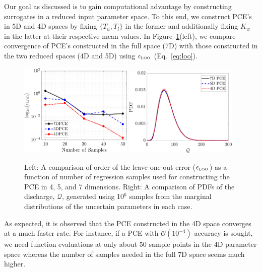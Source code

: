 Our goal as discussed is to gain computational advantage by constructing
surrogates in a reduced input parameter space. To this end, we construct PCE's
in 5D and 4D spaces by fixing $\{T_u,T_l\}$ in the former and additionally
fixing $K_w$ in the latter at their respective mean values. In
Figure~\ref{fig:conv_bore}(left), we compare convergence of PCE's constructed in the
full space (7D) with those constructed in the two reduced spaces (4D and 5D)
using $\epsilon_{\mbox{\tiny{LOO}}}$ (Eq.~\ref{eq:loo}). 
\begin{figure}[htbp]
 \begin{center}
  \includegraphics[width=0.48\textwidth]{./Figures/err_samples_borehole}
  \includegraphics[width=0.48\textwidth]{./Figures/pdf_comp_borehole}
\caption{Left: A comparison of order of the leave-one-out-error 
($\epsilon_{\mbox{\tiny{LOO}}}$) as a function of number of regression samples
used for constructing the PCE in 4, 5, and 7 dimensions. Right: A comparison of
PDFs of the discharge, $\mathcal{Q}$, generated using 10$^{6}$ samples from
the marginal distributions of the uncertain parameters in each case.} 
\label{fig:conv_bore}
\end{center}
\end{figure}

As expected, it is observed that the PCE constructed in the 4D space converges
at a much faster rate. For instance, if a PCE with $\mathcal{O}(10^{-4})$
accuracy is sought, we need function evaluations at only about 50 sample points
in the 4D parameter space whereas the number of samples needed in the full 7D
space seems much higher.~ 


